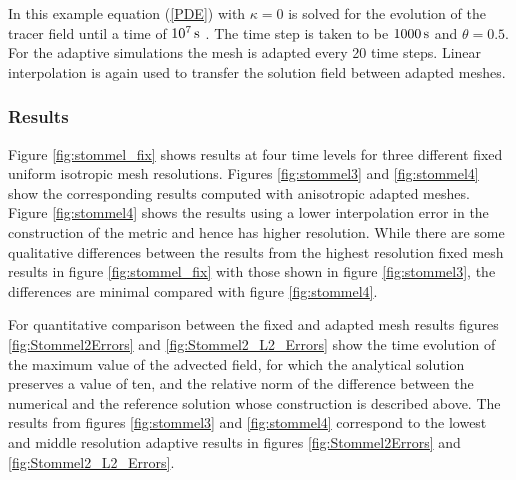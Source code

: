 In this example equation (\ref{PDE}) with $\kappa = 0$ is solved for the evolution of the tracer field until a
time of $\s[10^7]$ . The time step is taken to be $\s[1000]$ and $\theta=0.5$.
For the adaptive simulations the mesh is adapted every 20 time steps.
Linear interpolation is again used to transfer the solution field between adapted meshes.

\subsubsection{Results}

Figure \ref{fig:stommel_fix} shows results at four time levels for three
different fixed uniform isotropic mesh resolutions. Figures \ref{fig:stommel3}
and \ref{fig:stommel4} show the corresponding results computed with anisotropic
adapted meshes. Figure \ref{fig:stommel4} shows the results using a lower interpolation
error in the construction of the metric and hence has higher resolution. While there
are some qualitative differences between the results from the highest resolution fixed
mesh results in figure \ref{fig:stommel_fix} with those shown in figure \ref{fig:stommel3},
the differences are minimal compared with figure \ref{fig:stommel4}.

For quantitative comparison between the fixed and adapted mesh results figures \ref{fig:Stommel2Errors}
and \ref{fig:Stommel2_L2_Errors} show the time evolution of the maximum value of the advected field,
for which the analytical solution preserves a value of ten,
and the relative \Ltwo norm \cite{hanert2004} of the difference between the numerical and the reference
solution whose construction is described above. The results from figures \ref{fig:stommel3} and \ref{fig:stommel4}
correspond to the lowest and middle resolution adaptive results in figures \ref{fig:Stommel2Errors} and
\ref{fig:Stommel2_L2_Errors}.



